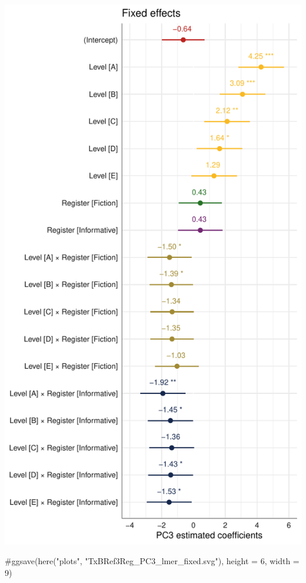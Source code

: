 \documentclass[
  letterpaper,
  DIV=11,
  numbers=noendperiod]{scrreprt}
\newenvironment{Shaded}{\begin{snugshade}}{\end{snugshade}}
\newcommand{\CommentTok}[1]{\textcolor[rgb]{0.37,0.37,0.37}{#1}}
\begin{document}
\includegraphics{AppendixH_files/figure-pdf/Dim3fixed-1.pdf}

\begin{Shaded}
\begin{Highlighting}[]
\CommentTok{\#ggsave(here("plots", "TxBRef3Reg\_PC3\_lmer\_fixed.svg"), height = 6, width = 9)}
\end{Highlighting}
\end{Shaded}
\end{document}
